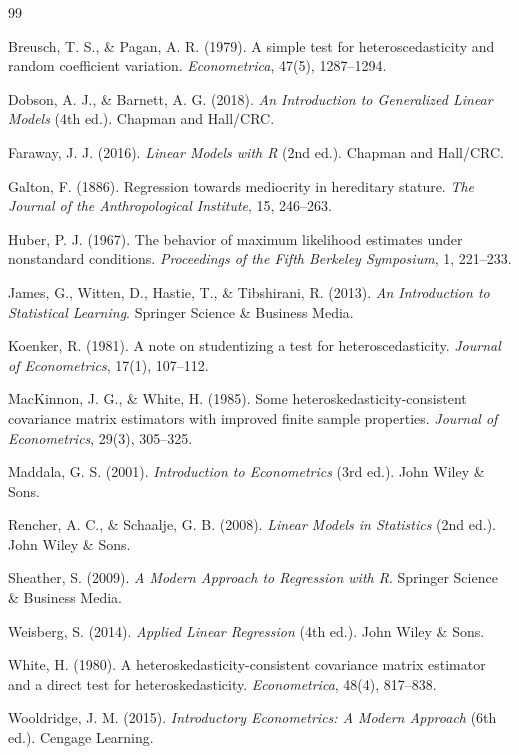 \documentclass[12pt, a4paper]{article}
\begin{document}
	\begin{thebibliography}{99}
		
		Breusch, T. S., \& Pagan, A. R. (1979). 
		A simple test for heteroscedasticity and random coefficient variation. 
		\textit{Econometrica}, 47(5), 1287--1294.
		
		Dobson, A. J., \& Barnett, A. G. (2018). 
		\textit{An Introduction to Generalized Linear Models} (4th ed.). 
		Chapman and Hall/CRC.
		
		Faraway, J. J. (2016). 
		\textit{Linear Models with R} (2nd ed.). 
		Chapman and Hall/CRC.
		
		Galton, F. (1886). 
		Regression towards mediocrity in hereditary stature. 
		\textit{The Journal of the Anthropological Institute}, 15, 246--263.
		
		Huber, P. J. (1967). 
		The behavior of maximum likelihood estimates under nonstandard conditions. 
		\textit{Proceedings of the Fifth Berkeley Symposium}, 1, 221--233.
		
		James, G., Witten, D., Hastie, T., \& Tibshirani, R. (2013). 
		\textit{An Introduction to Statistical Learning}. 
		Springer Science \& Business Media.
		
		Koenker, R. (1981). 
		A note on studentizing a test for heteroscedasticity. 
		\textit{Journal of Econometrics}, 17(1), 107--112.
		
		MacKinnon, J. G., \& White, H. (1985). 
		Some heteroskedasticity-consistent covariance matrix estimators with improved finite sample properties. 
		\textit{Journal of Econometrics}, 29(3), 305--325.
		
		Maddala, G. S. (2001). 
		\textit{Introduction to Econometrics} (3rd ed.). 
		John Wiley \& Sons.
		
		Rencher, A. C., \& Schaalje, G. B. (2008). 
		\textit{Linear Models in Statistics} (2nd ed.). 
		John Wiley \& Sons.
		
		Sheather, S. (2009). 
		\textit{A Modern Approach to Regression with R}. 
		Springer Science \& Business Media.
		
		Weisberg, S. (2014). 
		\textit{Applied Linear Regression} (4th ed.). 
		John Wiley \& Sons.
		
		White, H. (1980). 
		A heteroskedasticity-consistent covariance matrix estimator and a direct test for heteroskedasticity. 
		\textit{Econometrica}, 48(4), 817--838.
		
		Wooldridge, J. M. (2015). 
		\textit{Introductory Econometrics: A Modern Approach} (6th ed.). 
		Cengage Learning.
		
	\end{thebibliography}
	
\end{document}
